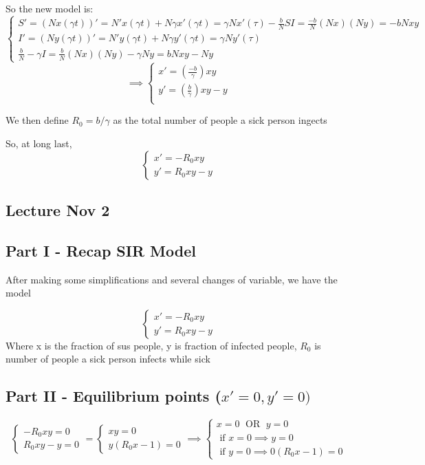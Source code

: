 \documentclass[12pt]{article}
\begin{document}
So the new model is:
\[\begin{cases}
    S' = (Nx(\gamma t))' = N' x(\gamma t) + N\gamma x'(\gamma t) = \gamma N x'(\tau)
    -\frac{b}{N} SI = \frac{-b}{N}(Nx)(Ny) = -bNxy\\
    I' = (Ny(\gamma t))' = N' y(\gamma t) + N\gamma y'(\gamma t) = \gamma N y'(\tau)\\
    \frac{b}{N} - \gamma I = \frac{b}{N}(Nx)(Ny) - \gamma Ny = bNxy - Ny
\end{cases}\]
\[\implies \begin{cases}
    x' = \left(\frac{-b}{\gamma}\right)xy\\
    y' = \left(\frac{b}{\gamma}\right)xy - y\\
\end{cases}\]

We then define $R_0 = b / \gamma$ as the total number of people a sick person ingects

So, at long last, 
\[\boxed{\begin{cases}
    x' = -R_0 xy\\
    y' = R_0 xy - y
\end{cases}}\]

\subsection{Lecture Nov 2}
\subsection*{Part I - Recap SIR Model}
After making some simplifications and several changes of variable, we have the model

\[\begin{cases}
    x' = -R_0 xy\\
    y' = R_0 xy - y
\end{cases}\]
Where x is the fraction of sus people, y is fraction of infected people, $R_0$ is number of people a sick person infects while sick

\subsection*{Part II - Equilibrium points ($x' = 0, y' = 0)$}
\[\begin{cases}
    -R_0 xy = 0\\
    R_0 xy - y = 0
\end{cases} = \begin{cases}
    xy = 0\\
    y(R_0 x - 1) = 0
\end{cases} \implies \begin{cases}
    x = 0 \; \text{ OR } \; y = 0\\
    \text{ if } x = 0 \implies y = 0\\
    \text{ if } y = 0 \implies 0 (R_0 x - 1) = 0 
\end{cases}\]
\end{document}
